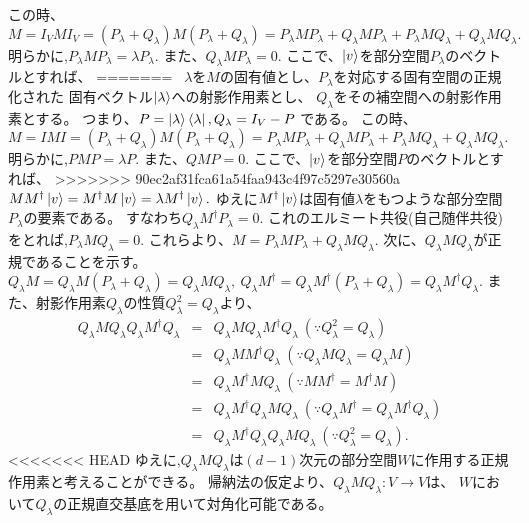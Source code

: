 この時、$M = I_VMI_V = 
(P_\lambda   + Q_\lambda ) M (P_\lambda  + Q_\lambda ) 
= P_\lambda  MP_\lambda  + Q_\lambda  M P_\lambda  + P_\lambda  M Q_\lambda  
+ Q_\lambda  M Q_\lambda  .$
明らかに,$P_\lambda MP_\lambda  = \lambda P_\lambda $. また、$Q_\lambda MP_\lambda  = 0.$
ここで、$\ket{v}$を部分空間$P_\lambda $のベクトルとすれば、
=======
~$\lambda$を$M$の固有値とし、$P_\lambda$を対応する固有空間の正規化された
固有ベクトル$\ket{\lambda}$への射影作用素とし、
$Q_\lambda$をその補空間への射影作用素とする。
つまり、$P = \ket{\lambda} \bra{\lambda}, Q_\lambda = I_V - P$
である。
この時、$M = IMI = 
(P_\lambda  + Q_\lambda) M (P_\lambda + Q_\lambda) 
= P_\lambda MP_\lambda + Q_\lambda M P_\lambda + P_\lambda M Q_\lambda 
+ Q_\lambda M Q_\lambda .$
明らかに,$PMP = \lambda P$. また、$QMP = 0.$
ここで、$\ket{v}$を部分空間$P$のベクトルとすれば、
>>>>>>> 90ec2af31fca61a54faa943c4f97c5297e30560a
$MM^\dagger \ket{v} = M^\dagger M \ket{v} = \lambda M^\dagger \ket{v}.$
ゆえに$M^\dagger \ket{v}$は固有値$\lambda$をもつような部分空間$P_\lambda $の要素である。
すなわち$Q_\lambda M^\dagger P_\lambda  = 0.$
これのエルミート共役(自己随伴共役)をとれば,$P_\lambda MQ_\lambda  = 0.$
これらより、$M = P_\lambda MP_\lambda  + Q_\lambda MQ_\lambda .$
\newline
次に、$Q_\lambda MQ_\lambda $が正規であることを示す。
$Q_\lambda M = Q_\lambda M(P_\lambda  + Q_\lambda ) = Q_\lambda MQ_\lambda ,~ Q_\lambda M^\dagger = Q_\lambda M^\dagger (P_\lambda  + Q_\lambda ) = Q_\lambda M^\dagger Q_\lambda .$
また、射影作用素$Q_\lambda $の性質$Q_\lambda ^2 = Q_\lambda $より、
\begin{eqnarray*}
Q_\lambda MQ_\lambda Q_\lambda M^\dagger Q_\lambda  &=& Q_\lambda MQ_\lambda M^\dagger Q_\lambda ~(\because Q_\lambda ^2 = Q_\lambda )\\
&=& Q_\lambda MM^\dagger Q_\lambda ~(\because Q_\lambda MQ_\lambda  = Q_\lambda M)\\
&=&Q_\lambda M^\dagger M Q_\lambda ~(\because MM^\dagger = M^\dagger M)\\
&=& Q_\lambda M^\dagger Q_\lambda MQ_\lambda ~(\because Q_\lambda M^\dagger = Q_\lambda M^\dagger Q_\lambda )\\
&=& Q_\lambda M^\dagger Q_\lambda Q_\lambda MQ_\lambda ~(\because Q_\lambda ^2 = Q_\lambda ).
\end{eqnarray*}
<<<<<<< HEAD
ゆえに,$Q_\lambda MQ_\lambda $は$(d-1)$次元の部分空間$W$に作用する正規作用素と考えることができる。
帰納法の仮定より、$Q_\lambda MQ_\lambda :V \rightarrow V$は、
$W$において$Q_\lambda $の正規直交基底を用いて対角化可能である。
